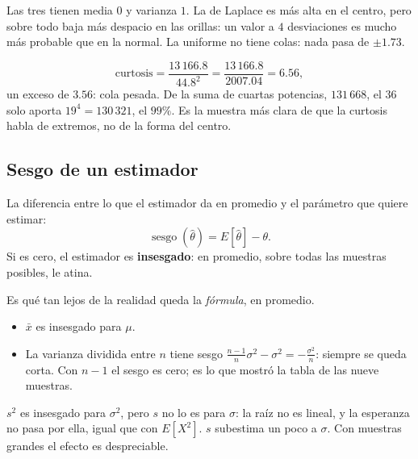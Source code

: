 \documentclass[11pt,letterpaper]{article}
\begin{document}
Las tres tienen media $0$ y varianza $1$. La de Laplace es más alta en
el centro, pero sobre todo baja más despacio en las orillas: un valor a
$4$ desviaciones es mucho más probable que en la normal. La uniforme
no tiene colas: nada pasa de $\pm 1.73$.

\begin{ejemplo}
    \[
        \text{curtosis} = \frac{13\,166.8}{44.8^2}
                        = \frac{13\,166.8}{2007.04} = 6.56 ,
    \]
    un exceso de $3.56$: cola pesada. De la suma de cuartas potencias,
    $131\,668$, el $36$ solo aporta $19^4 = 130\,321$, el $99\%$. Es la
    muestra más clara de que la curtosis habla de extremos, no de la
    forma del centro.
\end{ejemplo}


\subsection*{Sesgo de un estimador}

\begin{definicion}
    La diferencia entre lo que el estimador da en promedio y el
    parámetro que quiere estimar:
    \[
        \operatorname{sesgo}(\hat{\theta}) = E[\hat{\theta}] - \theta .
    \]
    Si es cero, el estimador es \textbf{insesgado}: en promedio, sobre
    todas las muestras posibles, le atina.
\end{definicion}

Es qué tan lejos de la realidad queda la \emph{fórmula}, en promedio.
\begin{itemize}[itemsep=0.3em]
    \item $\bar{x}$ es insesgado para $\mu$.
    \item La varianza dividida entre $n$ tiene sesgo
          $\frac{n-1}{n}\sigma^2 - \sigma^2 = -\frac{\sigma^2}{n}$:
          siempre se queda corta. Con $n - 1$ el sesgo es cero; es lo
          que mostró la tabla de las nueve muestras.
\end{itemize}

\begin{ojo}
    $s^2$ es insesgado para $\sigma^2$, pero $s$ no lo es para
    $\sigma$: la raíz no es lineal, y la esperanza no pasa por ella,
    igual que con $E[X^2]$. $s$ subestima un poco a $\sigma$. Con
    muestras grandes el efecto es despreciable.
\end{ojo}
\end{document}
